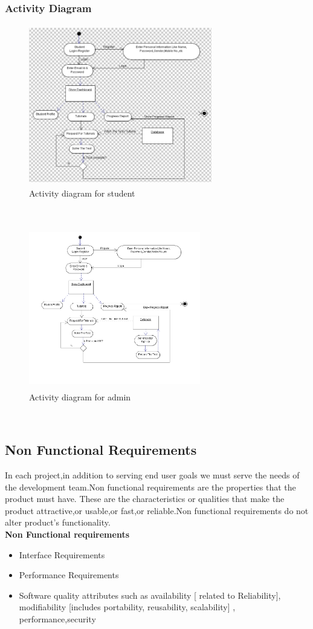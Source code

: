\documentclass[oneside,a4paper,12pt]{report}
\begin{document}
\subsubsection{Activity Diagram}
\begin{figure}[!h]
\centering
\includegraphics[height=7cm,width=8cm]{activitystudent.png}
\caption{Activity diagram for student}
\end{figure}
\\
\begin{figure}[!h]
\centering
\includegraphics[height=7cm,width=7.5cm]{activity_admin.png}
\caption{Activity diagram for admin}
\end{figure}
\\


\subsection{Non Functional Requirements} 
\hspace{0.3in}In each project,in addition to serving end user goals we must serve the needs of the development team.Non functional requirements are the properties that the product must have. These are the characteristics or qualities that make the product attractive,or usable,or fast,or reliable.Non functional requirements do not alter product's functionality.\\
\textbf{Non Functional requirements}
\begin{itemize}
\item Interface Requirements
\item Performance Requirements
\item Software quality attributes such as availability [ related to Reliability],
modifiability [includes portability, reusability, scalability] , performance,security
\end{itemize}
\end{document}
